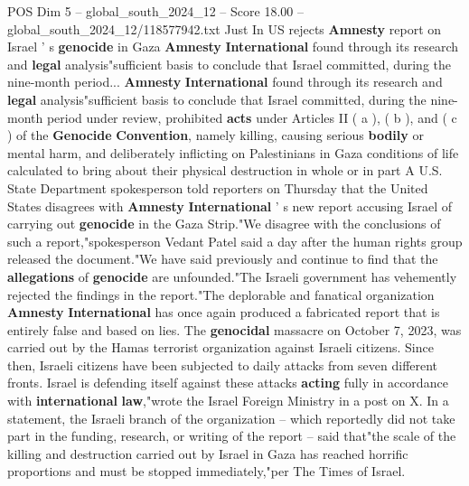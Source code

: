\begin{textsample}{POS Dim 5 – global\_south\_2024\_12 – Score 18.00 – global\_south\_2024\_12/118577942.txt}  \label{ex:f5_pos_052}
Just In US rejects \textbf{Amnesty} report on Israel ' s \textbf{genocide} in Gaza \textbf{Amnesty} \textbf{International} found through its research and \textbf{legal} analysis"sufficient basis to conclude that Israel committed, during the nine-month period... \textbf{Amnesty} \textbf{International} found through its research and \textbf{legal} analysis"sufficient basis to conclude that Israel committed, during the nine-month period under review, prohibited \textbf{acts} under Articles II ( a ), ( b ), and ( c ) of the \textbf{Genocide} \textbf{Convention}, namely killing, causing serious \textbf{bodily} or mental harm, and deliberately inflicting on Palestinians in Gaza conditions of life calculated to bring about their physical destruction in whole or in part A U.S.
State Department spokesperson told reporters on Thursday that the United States disagrees with \textbf{Amnesty} \textbf{International} ' s new report accusing Israel of carrying out \textbf{genocide} in the Gaza Strip."We disagree with the conclusions of such a report,"spokesperson Vedant Patel said a day after the human rights group released the document."We have said previously and continue to find that the \textbf{allegations} of \textbf{genocide} are unfounded."The Israeli government has vehemently rejected the findings in the report."The deplorable and fanatical organization \textbf{Amnesty} \textbf{International} has once again produced a fabricated report that is entirely false and based on lies.
The \textbf{genocidal} massacre on October 7, 2023, was carried out by the Hamas terrorist organization against Israeli citizens.
Since then, Israeli citizens have been subjected to daily attacks from seven different fronts.
Israel is defending itself against these attacks \textbf{acting} fully in accordance with \textbf{international} \textbf{law},"wrote the Israel Foreign Ministry in a post on X.
In a statement, the Israeli branch of the organization -- which reportedly did not take part in the funding, research, or writing of the report -- said that"the scale of the killing and destruction carried out by Israel in Gaza has reached horrific proportions and must be stopped immediately,"per The Times of Israel.

\end{textsample}

